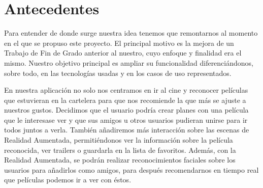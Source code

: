 


\section{Antecedentes}
\label{makereference1.1}

Para entender de donde surge nuestra idea tenemos que remontarnos al momento en el que se propuso este proyecto.
El principal motivo es la mejora de un Trabajo de Fin de Grado anterior
 al nuestro\cite{TFGRA16}, cuyo enfoque y finalidad era el mismo. Nuestro objetivo principal es 
 ampliar su funcionalidad diferenciándonos, sobre todo, en las tecnologías usadas y 
 en los casos de uso representados.

 En nuestra aplicación no solo nos centramos en ir al cine y reconocer películas que estuvieran en la cartelera
 para que nos recomiende la que más se ajuste a nuestros gustos. Decidimos que el usuario podría crear planes con
 una película que le interesase ver y que sus amigos u otros usuarios pudieran unirse para ir todos juntos a verla.
 También añadiremos más interacción sobre las escenas de Realidad Aumentada, permitiéndonos ver la información sobre la 
 película reconocida, ver trailers o guardarla en la lista de favoritos. Además, con la Realidad Aumentada,
 se podrán realizar reconocimientos faciales sobre los usuarios para añadirlos como amigos, para después recomendarnos en tiempo real
 que películas podemos ir a ver con éstos.

